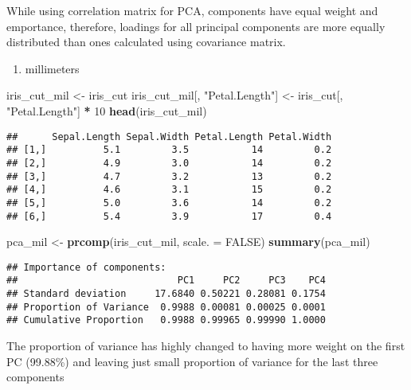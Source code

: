 \documentclass[
]{article}
\newenvironment{Shaded}{\begin{snugshade}}{\end{snugshade}}
\newcommand{\AttributeTok}[1]{\textcolor[rgb]{0.13,0.29,0.53}{#1}}
\newcommand{\ConstantTok}[1]{\textcolor[rgb]{0.56,0.35,0.01}{#1}}
\newcommand{\DecValTok}[1]{\textcolor[rgb]{0.00,0.00,0.81}{#1}}
\newcommand{\FunctionTok}[1]{\textcolor[rgb]{0.13,0.29,0.53}{\textbf{#1}}}
\newcommand{\NormalTok}[1]{#1}
\newcommand{\OtherTok}[1]{\textcolor[rgb]{0.56,0.35,0.01}{#1}}
\newcommand{\SpecialCharTok}[1]{\textcolor[rgb]{0.81,0.36,0.00}{\textbf{#1}}}
\newcommand{\StringTok}[1]{\textcolor[rgb]{0.31,0.60,0.02}{#1}}
\providecommand{\tightlist}{%
  \setlength{\itemsep}{0pt}\setlength{\parskip}{0pt}}
\begin{document}
While using correlation matrix for PCA, components have equal weight and
emportance, therefore, loadings for all principal components are more
equally distributed than ones calculated using covariance matrix.

\begin{enumerate}
\def\labelenumi{\alph{enumi}.}
\setcounter{enumi}{2}
\tightlist
\item
  millimeters
\end{enumerate}

\begin{Shaded}
\begin{Highlighting}[]
\NormalTok{iris\_cut\_mil }\OtherTok{\textless{}{-}}\NormalTok{ iris\_cut}
\NormalTok{iris\_cut\_mil[, }\StringTok{"Petal.Length"}\NormalTok{] }\OtherTok{\textless{}{-}}\NormalTok{ iris\_cut[, }\StringTok{"Petal.Length"}\NormalTok{] }\SpecialCharTok{*} \DecValTok{10}
\FunctionTok{head}\NormalTok{(iris\_cut\_mil)}
\end{Highlighting}
\end{Shaded}

\begin{verbatim}
##      Sepal.Length Sepal.Width Petal.Length Petal.Width
## [1,]          5.1         3.5           14         0.2
## [2,]          4.9         3.0           14         0.2
## [3,]          4.7         3.2           13         0.2
## [4,]          4.6         3.1           15         0.2
## [5,]          5.0         3.6           14         0.2
## [6,]          5.4         3.9           17         0.4
\end{verbatim}

\begin{Shaded}
\begin{Highlighting}[]
\NormalTok{pca\_mil }\OtherTok{\textless{}{-}} \FunctionTok{prcomp}\NormalTok{(iris\_cut\_mil, }\AttributeTok{scale. =} \ConstantTok{FALSE}\NormalTok{)}
\FunctionTok{summary}\NormalTok{(pca\_mil)}
\end{Highlighting}
\end{Shaded}

\begin{verbatim}
## Importance of components:
##                            PC1     PC2     PC3    PC4
## Standard deviation     17.6840 0.50221 0.28081 0.1754
## Proportion of Variance  0.9988 0.00081 0.00025 0.0001
## Cumulative Proportion   0.9988 0.99965 0.99990 1.0000
\end{verbatim}

The proportion of variance has highly changed to having more weight on
the first PC (99.88\%) and leaving just small proportion of variance for
the last three components
\end{document}
